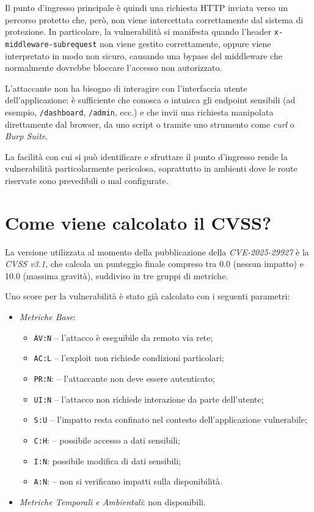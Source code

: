 \documentclass[a4paper,oneside,12pt]{report}
\begin{document}
Il punto d’ingresso principale è quindi una richiesta HTTP inviata verso un percorso protetto che, però, non viene intercettata correttamente dal sistema di protezione. In particolare, la vulnerabilità si manifesta quando l’header \texttt{x-middleware-subrequest} non viene gestito correttamente, oppure viene interpretato in modo non sicuro, causando una bypass del middleware che normalmente dovrebbe bloccare l’accesso non autorizzato.

L’attaccante non ha bisogno di interagire con l’interfaccia utente dell’applicazione: è sufficiente che conosca o intuisca gli endpoint sensibili (ad esempio, \texttt{/dashboard}, \texttt{/admin}, ecc.) e che invii una richiesta manipolata direttamente dal browser, da uno script o tramite uno strumento come \textit{curl} o \textit{Burp Suite}.

La facilità con cui si può identificare e sfruttare il punto d’ingresso rende la vulnerabilità particolarmente pericolosa, soprattutto in ambienti dove le route riservate sono prevedibili o mal configurate.

\section{Come viene calcolato il CVSS?}
\label{sec:come-viene-calcolato-cvss}

La versione utilizzata al momento della pubblicazione della \emph{CVE-2025-29927} è la \emph{CVSS v3.1}, che calcola un punteggio finale compreso tra 0.0 (nessun impatto) e 10.0 (massima gravità), suddiviso in tre gruppi di metriche.

Uno score per la vulnerabilit\`a \`e stato gi\`a calcolato con i seguenti parametri:
\begin{itemize}
  \item \emph{Metriche Base}:
	\begin{itemize}
		\item \texttt{AV:N} -- l'attacco è eseguibile da remoto via rete;
		\item \texttt{AC:L} -- l’exploit non richiede condizioni particolari;
		\item \texttt{PR:N}: -- l’attaccante non deve essere autenticato;
		\item \texttt{UI:N} -- l’attacco non richiede interazione da parte dell’utente;
		\item \texttt{S:U} -- l’impatto resta confinato nel contesto dell’applicazione vulnerabile;
		\item \texttt{C:H}: -- possibile accesso a dati sensibili;
		\item \texttt{I:N}: possibile modifica di dati sensibili;
		\item \texttt{A:N}: -- non si verificano impatti sulla disponibilit\`a.
	\end{itemize}
  \item \emph{Metriche Temporali e Ambientali}: non disponibili.
\end{itemize}
\end{document}
